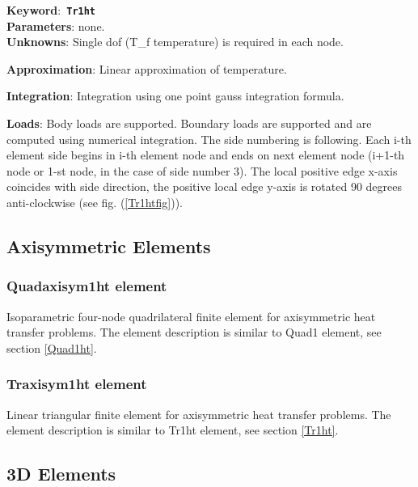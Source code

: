 \documentclass[a4paper]{article}
\newcommand{\descitem}[1]{{\noindent \bf #1}:}
\newcommand{\elemkeyword}[1]{\descitem{Keyword}~{\bf \texttt{#1}}}
\begin{document}
\elemkeyword{Tr1ht}\\
\descitem{Parameters} none.\\
\descitem{Unknowns}
Single dof (T\_f temperature) is  required in each node.

\descitem{Approximation} Linear approximation of temperature.

\descitem{Integration}
Integration using one point gauss integration formula.

\descitem{Loads} Body loads are supported. Boundary loads are
supported and are computed  using numerical integration. The side numbering is
following. Each i-th element side begins in i-th element node and
ends on next element node (i+1-th node or 1-st node, in the case of 
side number 3). The local positive edge x-axis coincides with side
direction, the positive local edge y-axis is rotated 90 degrees
anti-clockwise (see fig. (\ref{Tr1htfig})).



\subsection{Axisymmetric Elements}
\subsubsection{Quadaxisym1ht element}
Isoparametric four-node quadrilateral finite element for
axisymmetric heat transfer problems. The element description is
similar to Quad1 element, see section \ref{Quad1ht}.


\subsubsection{Traxisym1ht element}
Linear triangular finite element for axisymmetric heat transfer
problems. The element description is
similar to Tr1ht element, see section \ref{Tr1ht}.

\subsection{3D Elements}
\end{document}
